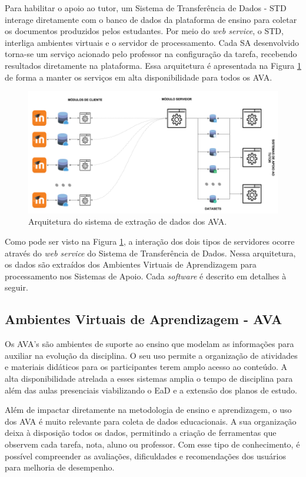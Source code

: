 Para habilitar o apoio ao tutor, um Sistema de Transferência de Dados - STD interage diretamente com o banco de dados da plataforma de ensino para coletar os documentos produzidos pelos estudantes. Por meio do \textit{web service}, o STD, interliga ambientes virtuais e o servidor de processamento. Cada SA desenvolvido torna-se um serviço acionado pelo professor na configuração da tarefa, recebendo resultados diretamente na plataforma. Essa arquitetura é apresentada na Figura \ref{fig-architecture} de forma a manter os serviços em alta disponibilidade para todos os AVA.

\begin{figure}[ht]
\centering
\includegraphics[width=.9\textwidth]{img/plugin_moodle.png}
\caption{Arquitetura do sistema de extração de dados dos AVA.}
\label{fig-architecture}
\end{figure}

Como pode ser visto na Figura \ref{fig-architecture}, a interação dos dois tipos de servidores ocorre através do \textit{web service} do Sistema de Transferência de Dados. Nessa arquitetura, os dados são extraídos dos Ambientes Virtuais de Aprendizagem para processamento nos Sistemas de Apoio. Cada \textit{software} é descrito em detalhes à seguir.

\subsection{Ambientes Virtuais de Aprendizagem - AVA}
Os AVA's são ambientes de suporte ao ensino que modelam as informações para auxiliar na evolução da disciplina. O seu uso permite a organização de atividades e materiais didáticos para os participantes terem amplo acesso ao conteúdo. A alta disponibilidade atrelada a esses sistemas amplia o tempo de disciplina para além das aulas presenciais viabilizando o EaD e a extensão dos planos de estudo.

Além de impactar diretamente na metodologia de ensino e aprendizagem, o uso dos AVA é muito relevante para coleta de dados educacionais. A sua organização deixa à disposição todos os dados, permitindo a criação de ferramentas que observem cada tarefa, nota, aluno ou professor. Com esse tipo de conhecimento, é possível compreender as avaliações, dificuldades e recomendações dos usuários para melhoria de desempenho.

